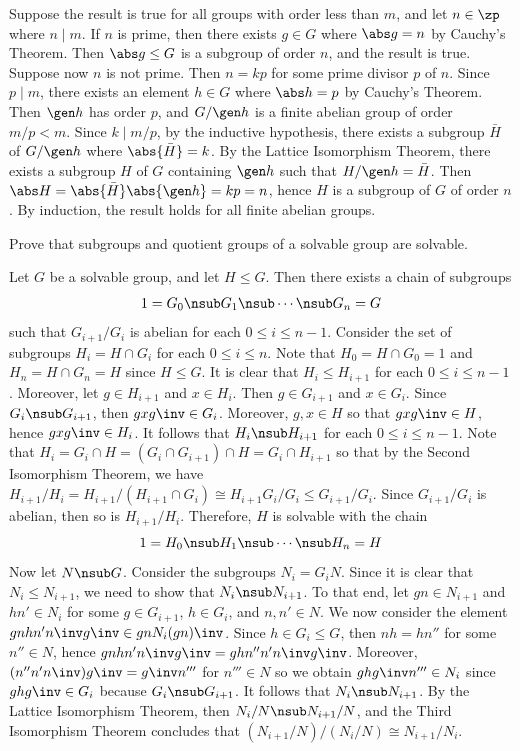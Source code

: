 \begin{problems}
\begin{sol}
        Suppose the result is true for all groups with order less than $m$, and let $n \in \zp$ where $n \mid m$. If $n$ is prime, then there exists $g \in G$ where $\abs g = n$ by Cauchy's Theorem. Then $\abs g \leq G$ is a subgroup of order $n$, and the result is true. Suppose now $n$ is not prime. Then $n = kp$ for some prime divisor $p$ of $n$. Since $p \mid m$, there exists an element $h \in G$ where $\abs h = p$ by Cauchy's Theorem. Then $\gen h$ has order $p$, and $G/\gen h$ is a finite abelian group of order $m/p < m$. Since $k \mid m/p$, by the inductive hypothesis, there exists a subgroup $\bar H$ of $G/\gen h$ where $\abs{\bar H} = k$. By the Lattice Isomorphism Theorem, there exists a subgroup $H$ of $G$ containing $\gen h$ such that $H/\gen h = \bar H$. Then $\abs H = \abs{\bar H} \abs{\gen h} = kp = n$, hence $H$ is a subgroup of $G$ of order $n$. By induction, the result holds for all finite abelian groups.
    \end{sol}
    \item Prove that subgroups and quotient groups of a solvable group are solvable.
    \begin{sol}
        Let $G$ be a solvable group, and let $H \leq G$. Then there exists a chain of subgroups
        \[1 = G_0 \nsub G_1 \nsub \cdots \nsub G_n = G\]
        such that $G_{i + 1}/G_i$ is abelian for each $0 \leq i \leq n - 1$. Consider the set of subgroups $H_i = H \cap G_i$ for each $0 \leq i \leq n$. Note that $H_0 = H \cap G_0 = 1$ and $H_n = H \cap G_n = H$ since $H \leq G$. It is clear that $H_i \leq H_{i + 1}$ for each $0 \leq i \leq n - 1$. Moreover, let $g \in H_{i + 1}$ and $x \in H_i$. Then $g \in G_{i + 1}$ and $x \in G_i$. Since $G_i \nsub G_{i + 1}$, then $gxg\inv \in G_i$. Moreover, $g, x \in H$ so that $gxg\inv \in H$, hence $gxg\inv \in H_i$. It follows that $H_i \nsub H_{i + 1}$ for each $0 \leq i \leq n - 1$. Note that $H_i = G_i \cap H = (G_i \cap G_{i + 1}) \cap H = G_i \cap H_{i + 1}$ so that by the Second Isomorphism Theorem, we have $H_{i + 1}/H_i = H_{i + 1}/(H_{i + 1} \cap G_i) \cong H_{i + 1}G_i/G_i \leq G_{i + 1}/G_i$. Since $G_{i + 1}/G_i$ is abelian, then so is $H_{i + 1}/H_i$. Therefore, $H$ is solvable with the chain
        \[1 = H_0 \nsub H_1 \nsub \cdots \nsub H_n = H\]
        Now let $N \nsub G$. Consider the subgroups $N_i = G_iN$. Since it is clear that $N_i \leq N_{i + 1}$, we need to show that $N_i \nsub N_{i + 1}$. To that end, let $gn \in N_{i + 1}$ and $hn' \in N_i$ for some $g \in G_{i + 1}$, $h \in G_i$, and $n, n' \in N$. We now consider the element $gnhn'n\inv g\inv \in gnN_i(gn)\inv$. Since $h \in G_i \leq G$, then $nh = hn''$ for some $n'' \in N$, hence $gnhn'n\inv g\inv = ghn''n'n\inv g\inv$. Moreover, $(n''n'n\inv)g\inv = g\inv n'''$ for $n''' \in N$ so we obtain $ghg\inv n''' \in N_i$ since $ghg\inv \in G_i$ because $G_i \nsub G_{i + 1}$. It follows that $N_i \nsub N_{i + 1}$. By the Lattice Isomorphism Theorem, then $N_i/N \nsub N_{i + 1}/N$, and the Third Isomorphism Theorem concludes that $(N_{i + 1}/N)/(N_i/N) \cong N_{i + 1}/N_i$. 


\end{sol}
\end{problems}
